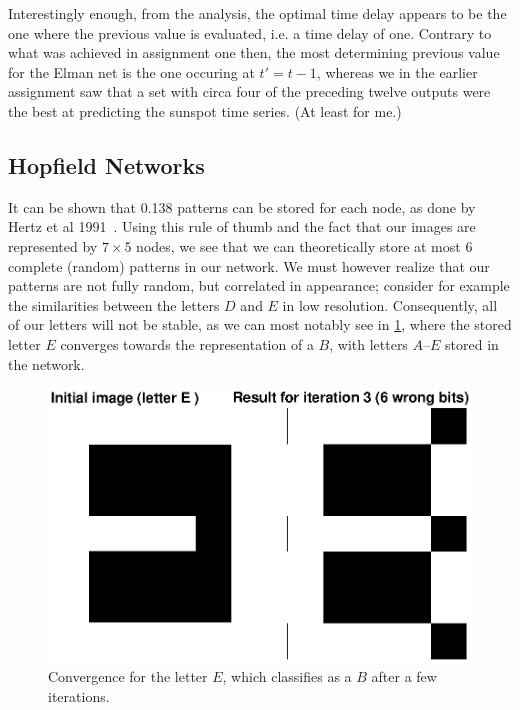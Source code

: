 \documentclass[a4paper,12pt]{article}
\theoremstyle{plain}
\theoremstyle{definition}
\begin{document}
      Interestingly enough, from the analysis, the optimal time delay appears to
      be the one where the previous value is evaluated, i.e. a time delay of
      one. Contrary to what was achieved in assignment one then, the most
      determining previous value for the Elman net is the one occuring at
      $t' = t-1$, whereas we in the earlier assignment saw that a set with circa
      four of the preceding twelve outputs were the best at predicting the
      sunspot time series. (At least for me.) 

   \subsection{Hopfield Networks}
   
      It can be shown that 0.138 patterns can be stored for each node, as done
      by Hertz et al 1991~\cite{hertz}. Using this rule of thumb and the fact
      that our images are represented by $7 \times 5$ nodes, we see that we can
      theoretically store at most 6 complete (random) patterns in our network.
      We must however realize that our patterns are not fully random, but
      correlated in appearance; consider for example the similarities between
      the letters $D$ and $E$ in low resolution. Consequently, all of our letters will
      not be stable, as we can most notably see in \cref{fig:12_eandb}, where the stored letter
      $E$ converges towards the representation of a $B$, with letters
      $A$--$E$ stored in the network.
      
      \begin{figure}[H]
         \centering
         \includegraphics[scale=.6]{12_eandb}
         \caption{Convergence for the letter $E$, which classifies as a
         $B$ after a few iterations.}
         \label{fig:12_eandb}
      \end{figure}
\end{document}

